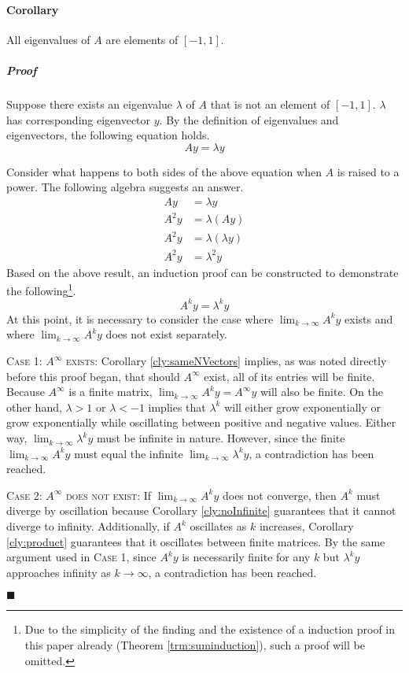 \documentclass[titlepage]{article}
\newcounter{corollary}
\newenvironment{corollary}[2]{
    \setenumerate{itemindent=15pt}
    \refstepcounter{corollary}\label{#1}
    \paragraph{Corollary \thecorollary}\hangindent=15pt #2

    \setlength{\leftskip}{15pt}
    \subparagraph{\hspace{-15pt}Proof}
}{

    \setlength{\leftskip}{0pt}
    \qed
}
\newcommand{\qed}{
    \begin{flushright}
        $\blacksquare$
    \end{flushright}
}
\begin{document}
\begin{corollary}{cly:eigenvalueRange}{
    All eigenvalues of $A$ are elements of $[-1,1]$.
}
    Suppose there exists an eigenvalue $\lambda$ of $A$ that is not an element of $[-1,1]$. $\lambda$ has corresponding eigenvector $y$. By the definition of eigenvalues and eigenvectors, the following equation holds.
    \begin{equation*}
        Ay = \lambda y
    \end{equation*}\par
    Consider what happens to both sides of the above equation when $A$ is raised to a power. The following algebra suggests an answer.
    \begin{align*}
        Ay &= \lambda y\\
        A^2y &= \lambda(Ay)\\
        A^2y &= \lambda(\lambda y)\\
        A^2y &= \lambda^2y
    \end{align*}
    Based on the above result, an induction proof can be constructed to demonstrate the following\footnote{Due to the simplicity of the finding and the existence of a induction proof in this paper already (Theorem \ref{trm:suminduction}), such a proof will be omitted.}.
    \begin{equation*}
        A^ky = \lambda^ky
    \end{equation*}
    At this point, it is necessary to consider the case where $\lim_{k\to\infty}A^ky$ exists and where $\lim_{k\to\infty}A^ky$ does not exist separately.\par
    \textsc{Case 1: $A^\infty$ exists}: Corollary \ref{cly:sameNVectors} implies, as was noted directly before this proof began, that should $A^\infty$ exist, all of its entries will be finite. Because $A^\infty$ is a finite matrix, $\lim_{k\to\infty}A^ky=A^\infty y$ will also be finite. On the other hand, $\lambda>1$ or $\lambda<-1$ implies that $\lambda^k$ will either grow exponentially or grow exponentially while oscillating between positive and negative values. Either way, $\lim_{k\to\infty}\lambda^ky$ must be infinite in nature. However, since the finite $\lim_{k\to\infty}A^ky$ must equal the infinite $\lim_{k\to\infty}\lambda^ky$, a contradiction has been reached.\par
    \textsc{Case 2: $A^\infty$ does not exist}: If $\lim_{k\to\infty}A^ky$ does not converge, then $A^k$ must diverge by oscillation because Corollary \ref{cly:noInfinite} guarantees that it cannot diverge to infinity. Additionally, if $A^k$ oscillates as $k$ increases, Corollary \ref{cly:product} guarantees that it oscillates between finite matrices. By the same argument used in \textsc{Case 1}, since $A^ky$ is necessarily finite for any $k$ but $\lambda^ky$ approaches infinity as $k\to\infty$, a contradiction has been reached.
\end{corollary}
\end{document}

